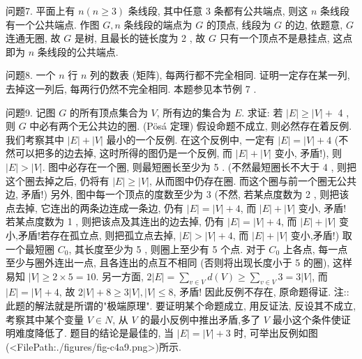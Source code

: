 问题7. 平面上有 $n(n \geqslant 3)$ 条线段, 其中任意 3 条都有公共端点, 则这 $n$ 条线段有一个公共端点.
作图 $G, n$ 条线段的端点为 $G$ 的顶点, 线段为 $G$ 的边, 依题意, $G$ 连通无圈, 故 $G$ 是树, 且最长的链长度为 2 , 故 $G$ 只有一个顶点不是悬挂点, 这点即为 $n$ 条线段的公共端点.



问题8. 一个 $n$ 行 $n$ 列的数表 (矩阵), 每两行都不完全相同.
证明一定存在某一列, 去掉这一列后, 每两行仍然不完全相同.
本题参见本节例 7 .



问题9. 记图 $G$ 的所有顶点集合为 $V$, 所有边的集合为 $E$. 求证: 若 $|E| \geqslant|V|+$ 4 , 则 $G$ 中必有两个无公共边的圈.
(Pösá 定理) 
假设命题不成立, 则必然存在着反例.
我们考察其中 $|E|+|V|$ 最小的一个反例.
在这个反例中, 一定有 $|E|=|V|+4$ (不然可以把多的边去掉, 这时所得的图仍是一个反例, 而 $|E|+|V|$ 变小, 矛盾!), 则 $|E|>|V|$. 图中必存在一个圈, 则最短圈长至少为 5 . (不然最短圈长不大于 4 , 则把这个圈去掉之后, 仍将有 $|E| \geqslant|V|$, 从而图中仍存在圈.
而这个圈与前一个圈无公共边, 矛盾!) 另外, 图中每一个顶点的度数至少为 3 (不然, 若某点度数为 2 , 则把该点去掉, 它连出的两条边连成一条边, 仍有 $|E|=|V|+4$, 而 $|E|+ |V|$ 变小, 矛盾! 若某点度数为 1 , 则把该点及其连出的边去掉, 仍有 $|E|= |V|+4$, 而 $|E|+|V|$ 变小,矛盾!若存在孤立点, 则把孤立点去掉, $|E|>|V|+4$, 而 $|E|+|V|$ 变小,矛盾!)
取一个最短圈 $C_0$, 其长度至少为 5 , 则圈上至少有 5 个点.
对于 $C_0$ 上各点, 每一点至少与圈外连出一点, 且各连出的点互不相同 (否则将出现长度小于 5 的圈), 这样易知 $|V| \geqslant 2 \times 5=10$. 另一方面, $2|E|=\sum_{v \in V} d(V) \geqslant \sum_{v \in V} 3= 3|V|$, 而 $|E|=|V|+4$, 故 $2|V|+8 \geqslant 3|V|,|V| \leqslant 8$, 矛盾!
因此反例不存在, 原命题得证.
注:: 此题的解法就是所谓的"极端原理". 要证明某个命题成立, 用反证法, 反设其不成立, 考察其中某个变量 $V \in N$, 从 $V$ 的最小反例中推出矛盾,多了 $V$ 最小这个条件使证明难度降低了.
题目的结论是最佳的, 当 $|E|=|V|+3$ 时, 可举出反例如图(<FilePath:./figures/fig-c4a9.png>)所示.



